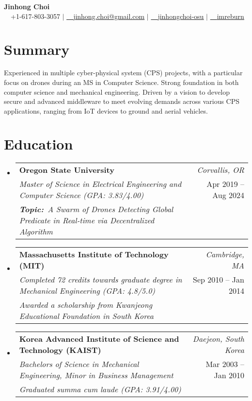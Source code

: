 \documentclass[letterpaper,10pt]{article}
\makeatletter
\newcommand{\resumeSubheadingNewLine}[5]{
  \vspace{-2pt}\item
    \begin{tabular*}{0.97\textwidth}[t]{l@{\extracolsep{\fill}}r}
      \textbf{\small#1} & \textit{\small #2} \\
      \textit{\small#3} & \small #4 \\
      {\small#5} & \\
    \end{tabular*}\vspace{-6pt}
}
\newcommand{\resumeSubHeadingListStart}{\begin{itemize}[leftmargin=0.05in, label={}]}
\newcommand{\resumeSubHeadingListEnd}{\end{itemize}}
\makeatother
\begin{document}

\begin{center}
    \textbf{\huge Jinhong Choi} \\ \vspace{5pt}
    \small \faMobile~~+1-617-803-3057 $|$ \href{mailto:jinhong.choi@gmail.com}{\faEnvelope~~\underline{jinhong.choi@gmail.com}} $|$ 
    \href{https://linkedin.com/in/jinhongchoi-osu}{\faLinkedin~~\underline{jinhongchoi-osu}} $|$
    \href{https://github.com/imreburn}{\faGithub~~\underline{imreburn}}
\end{center}

\section{Summary}
\vspace{-2pt}
\begin{itemize}[leftmargin=0.05in, label={}, rightmargin=0.15in]
\small{\item{Experienced in multiple cyber-physical system (CPS) projects, with a particular focus on drones during an MS in Computer Science. Strong foundation in both computer science and mechanical engineering. Driven by a vision to develop secure and advanced middleware to meet evolving demands across various CPS applications, ranging from IoT devices to ground and aerial vehicles.}}
\end{itemize}\vspace{-1.5em}

\section{Education}
  \resumeSubHeadingListStart
    \resumeSubheadingNewLine
      {Oregon State University}{Corvallis, OR}
      {Master of Science in  Electrical Engineering and Computer Science (GPA: 3.83/4.00)}{Apr 2019 -- Aug 2024}{\textit{\textbf{Topic:}~A Swarm of Drones Detecting Global Predicate in Real-time via Decentralized Algorithm}}
    \resumeSubheadingNewLine
      {Massachusetts Institute of Technology (MIT)}{Cambridge, MA}
      {Completed 72 credits towards graduate degree in Mechanical Engineering (GPA: 4.8/5.0)}{Sep 2010 -- Jan 2014}{\textit{Awarded a scholarship from Kwanjeong Educational Foundation in South Korea}}
    \resumeSubheadingNewLine
      {Korea Advanced Institute of Science and Technology (KAIST)}{Daejeon, South Korea}
      {Bachelors of Science in Mechanical Engineering, Minor in Business Management}{Mar 2003 -- Jan 2010}{\textit{Graduated summa cum laude (GPA: 3.91/4.00)}}
  \resumeSubHeadingListEnd
\end{document}
